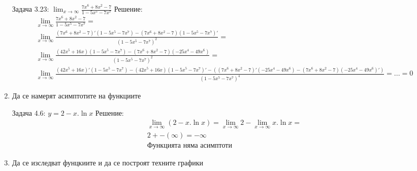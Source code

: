 \documentclass[a4paper, 20pt, fleqn, border=2pt]{article}
\begin{document}
\begin{enumerate}
Задача 3.23: $\lim_{x\to\infty}\frac{7x^6 + 8x^2 - 7}{1 - 5x^5 - 7x^7}$
Решение:
\begin{equation}
\begin{split}
    \lim_{x\to\infty}\frac{7x^6 + 8x^2 - 7}{1 - 5x^5 - 7x^7} = \\
    \lim_{x\to\infty}\frac{(7x^6 + 8x^2 - 7)'(1 - 5x^5 - 7x^7) - (7x^6 + 8x^2 - 7)(1 - 5x^5 - 7x^7)'}{(1 - 5x^5 - 7x^7) ^ 2} = \\
    \lim_{x\to\infty}\frac{(42x^5 + 16x)(1 - 5x^5 - 7x^7) - (7x^6 + 8x^2 - 7)(-25x^4 - 49x^6)}{(1 - 5x^5 - 7x^7) ^ 2} = \\
    \lim_{x\to\infty}\frac{(42x^5 + 16x)'(1 - 5x^5 - 7x^7) - (42x^5 + 16x)(1 - 5x^5 - 7x^7)' - ((7x^6 + 8x^2 - 7)'(-25x^4 - 49x^6) - (7x^6 + 8x^2 - 7)(-25x^4 - 49x^6)')}{(1 - 5x^5 - 7x^7) ^ 4} = 
    \text{...}
    = 0
\end{split}
\end{equation}

    \item Да се намерят асимптотите на функциите
\par
\par

Задача 4.6: $y = 2 - x.\ln{x}$
Решение:
\begin{equation}
\begin{split}
    \lim_{x\to\infty}(2-x.\ln{x}) = \lim_{x\to\infty}2 - \lim_{x\to\infty}x.\ln{x} = \\
    2 + - (\infty) = -\infty \\
    \text{Функцията няма асимптоти}
\end{split}
\end{equation}



    \item Да се изследват фунцкиите и да се построят техните графики
\par
\par


\end{enumerate}
\end{document}
